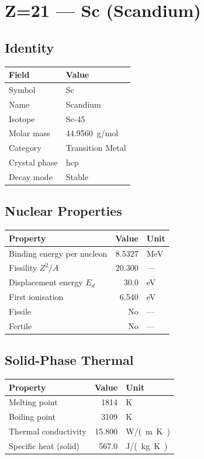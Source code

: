 \documentclass[11pt,a4paper]{article}
\begin{document}
\newpage

\section{Z=21 --- Sc (Scandium)}
\label{sec:Z21}

\subsection{Identity}
\begin{tabular}{ll}
  \toprule
  Field & Value \\
  \midrule
  Symbol & Sc \\
  Name & Scandium \\
  Isotope & Sc-45 \\
  Molar mass & \SI{44.9560}{g/mol} \\
  Category & Transition Metal \\
  Crystal phase & hcp \\
  Decay mode & Stable \\
  \bottomrule
\end{tabular}

\subsection{Nuclear Properties}
\begin{tabular}{lrl}
  \toprule
  Property & Value & Unit \\
  \midrule
  Binding energy per nucleon & 8.5327 & \si{MeV} \\
  Fissility $Z^2/A$ & 20.300 & --- \\
  Displacement energy $E_d$ & 30.0 & \si{eV} \\
  First ionisation & 6.540 & \si{eV} \\
  Fissile & No & --- \\
  Fertile & No & --- \\
  \bottomrule
\end{tabular}

\subsection{Solid-Phase Thermal}
\begin{tabular}{lrl}
  \toprule
  Property & Value & Unit \\
  \midrule
  Melting point & 1814 & \si{K} \\
  Boiling point & 3109 & \si{K} \\
  Thermal conductivity & 15.800 & \si{W/(m.K)} \\
  Specific heat (solid) & 567.0 & \si{J/(kg.K)} \\
  \bottomrule
\end{tabular}
\end{document}
